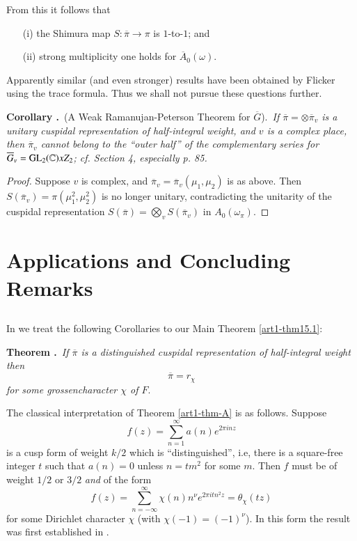 From this it follows that
\begin{itemize}
\item[(i)] the Shimura map $S:\overline{\pi}\to \pi$ is $1$-to-$1$; and

\item[(ii)] strong multiplicity one holds for $\overline{A}_{0}(\omega)$.
\end{itemize}

Apparently similar (and even stronger) results have been obtained by Flicker using the trace formula. Thus we shall not pursue these questions further.

\medskip
\noindent
{\bf Corollary .\label{art1-coro15.8}}~(A Weak Ramanujan-Peterson Theorem for $\overline{G}$).~{\em If $\overline{\pi}=\otimes \overline{\pi}_{v}$ is a unitary cuspidal representation of half-integral weight, and $v$ is a complex place, then $\overline{\pi}_{v}$ cannot belong to the ``outer half'' of the complementary series for $\overline{G}_{v}=\mathrm{GL}_{2}(\mathbb{C})xZ_{2}$; cf. \cite{Ge} Section 4, especially p. 85.}

\begin{proof}
Suppose $v$ is complex, and $\overline{\pi}_{v}=\overline{\pi}_{v}(\mu_{1},\mu_{2})$ is as above. Then\pageoriginale $S(\overline{\pi}_{v})=\pi(\mu^{2}_{1},\mu^{2}_{2})$ is no longer unitary, contradicting the unitarity of the cuspidal representation $S(\overline{\pi})=\bigotimes\limits_{v}S(\overline{\pi}_{v})$ in $A_{0}(\omega_{\pi})$.
\end{proof}

\section{Applications and Concluding Remarks}\label{art01-sec16}

\subsection{}\label{art1-sec16.1}
In \cite{GePS 2} we treat the following Corollaries to our Main Theorem \ref{art1-thm15.1}:

\medskip
\noindent
{\bf Theorem .\label{art1-thm-A}}~{\em If $\overline{\pi}$ is a distinguished cuspidal representation of half-integral weight then}
$$
\overline{\pi}=r_{\chi}
$$
{\em for some grossencharacter $\chi$ of $F$}.
\smallskip

The classical interpretation of Theorem \ref{art1-thm-A} is as follows. Suppose
$$
f(z)=\sum\limits^{\infty}_{n=1}a(n)e^{2\pi inz}
$$
is a cusp form of weight $k/2$ which is ``distinguished'', i.e, there is a square-free integer $t$ such that $a(n)=0$ unless $n=tm^{2}$ for some $m$. Then $f$ must be of weight $1/2$ or $3/2$ {\em and} of the form
$$
f(z)=\sum\limits^{\infty}_{n=-\infty}\chi(n)n^{\nu}e^{2\pi it n^{2}z}=\theta_{\chi}(tz)
$$
for some Dirichlet character $\chi$ (with $\chi(-1)=(-1)^{\nu}$). In this form the result was first established in \cite{Vigneras}.


